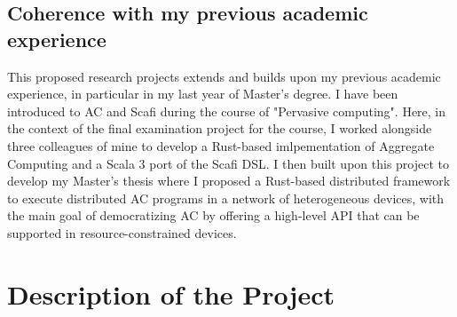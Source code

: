 \documentclass[12pt]{article}
\begin{document}
\subsection{Coherence with my previous academic experience}
\label{sec:coherence}
This proposed research projects extends and builds upon my previous academic experience, in particular in my last year of Master's degree.
I have been introduced to AC and Scafi during the course of "Pervasive computing". Here, in the context of the final examination project for the course,
I worked alongside three colleagues of mine to develop a Rust-based imlpementation of Aggregate Computing and a Scala 3 port of the Scafi DSL.
I then built upon this project to develop my Master's thesis where I proposed a Rust-based distributed framework to execute distributed AC programs in a network of
heterogeneous devices, with the main goal of democratizing AC by offering a high-level API that can be supported in resource-constrained devices.

\section{Description of the Project}
\end{document}
